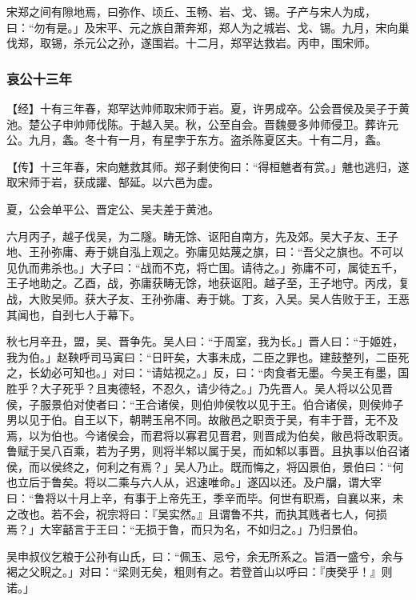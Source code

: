\documentclass[]{article}
\begin{document}
宋郑之间有隙地焉，曰弥作、顷丘、玉畅、岩、戈、锡。子产与宋人为成，曰：``勿有是。」及宋平、元之族自萧奔郑，郑人为之城岩、戈、锡。九月，宋向巢伐郑，取锡，杀元公之孙，遂围岩。十二月，郑罕达救岩。丙申，围宋师。

\hypertarget{header-n3179}{%
\subsubsection{哀公十三年}\label{header-n3179}}

【经】十有三年春，郑罕达帅师取宋师于岩。夏，许男成卒。公会晋侯及吴子于黄池。楚公子申帅师伐陈。于越入吴。秋，公至自会。晋魏曼多帅师侵卫。葬许元公。九月，螽。冬十有一月，有星孛于东方。盗杀陈夏区夫。十有二月，螽。

【传】十三年春，宋向魋救其师。郑子剩使徇曰：``得桓魋者有赏。」魋也逃归，遂取宋师于岩，获成讙、郜延。以六邑为虚。

夏，公会单平公、晋定公、吴夫差于黄池。

六月丙子，越子伐吴，为二隧。畴无馀、讴阳自南方，先及郊。吴大子友、王子地、王孙弥庸、寿于姚自泓上观之。弥庸见姑蔑之旗，曰：``吾父之旗也。不可以见仇而弗杀也。」大子曰：``战而不克，将亡国。请待之。」弥庸不可，属徒五千，王子地助之。乙酉，战，弥庸获畴无馀，地获讴阳。越子至，王子地守。丙戌，复战，大败吴师。获大子友、王孙弥庸、寿于姚。丁亥，入吴。吴人告败于王，王恶其闻也，自刭七人于幕下。

秋七月辛丑，盟，吴、晋争先。吴人曰：``于周室，我为长。」晋人曰：``于姬姓，我为伯。」赵鞅呼司马寅曰：``日旰矣，大事未成，二臣之罪也。建鼓整列，二臣死之，长幼必可知也。」对曰：``请姑视之。」反，曰：``肉食者无墨。今吴王有墨，国胜乎？大子死乎？且夷德轻，不忍久，请少待之。」乃先晋人。吴人将以公见晋侯，子服景伯对使者曰：``王合诸侯，则伯帅侯牧以见于王。伯合诸侯，则侯帅子男以见于伯。自王以下，朝聘玉帛不同。故敝邑之职贡于吴，有丰于晋，无不及焉，以为伯也。今诸侯会，而君将以寡君见晋君，则晋成为伯矣，敝邑将改职贡。鲁赋于吴八百乘，若为子男，则将半邾以属于吴，而如邾以事晋。且执事以伯召诸侯，而以侯终之，何利之有焉？」吴人乃止。既而悔之，将囚景伯，景伯曰：``何也立后于鲁矣。将以二乘与六人从，迟速唯命。」遂囚以还。及户牖，谓大宰曰：``鲁将以十月上辛，有事于上帝先王，季辛而毕。何世有职焉，自襄以来，未之改也。若不会，祝宗将曰：『吴实然。』且谓鲁不共，而执其贱者七人，何损焉？」大宰嚭言于王曰：``无损于鲁，而只为名，不如归之。」乃归景伯。

吴申叔仪乞粮于公孙有山氏，曰：``佩玉、忌兮，余无所系之。旨酒一盛兮，余与褐之父睨之。」对曰：``梁则无矣，粗则有之。若登首山以呼曰：『庚癸乎！』则诺。」
\end{document}
